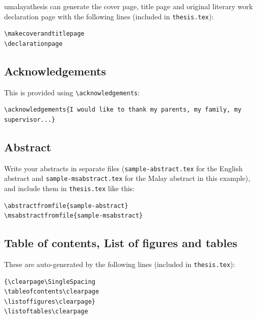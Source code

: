 \documentclass[a4paper,12pt]{scrartcl}
\begin{document}
\textsf{umalayathesis} can generate the cover page, title page and original literary work declaration page with the following lines (included in \texttt{thesis.tex}):

\medskip

\begin{lstlisting}[moretexcs={makecoverandtitlepage,copyrightpage,declarationpage}]
\makecoverandtitlepage
\declarationpage
\end{lstlisting}

\subsection{Acknowledgements}\label{sec:acknowledge}
This is provided using \lstinline|\acknowledgements|:

\medskip

\begin{lstlisting}
\acknowledgements{I would like to thank my parents, my family, my supervisor...}
\end{lstlisting}

\subsection{Abstract}\label{sec:abstract}
Write your abstracts in separate files (\texttt{sample-abstract.tex} for the English abstract and \texttt{sample-msabstract.tex} for the Malay abstract in this example), and include them in \texttt{thesis.tex} like this:

\begin{lstlisting}[moretexcs={abstractfromfile}]
\abstractfromfile{sample-abstract}
\msabstractfromfile{sample-msabstract}
\end{lstlisting}

\subsection{Table of contents, List of figures and tables}\label{sec:toc}

These are auto-generated by the following lines (included in \texttt{thesis.tex}):

\begin{lstlisting}[moretexcs={SingleSpacing,tableofcontents,listoftables,listoffigures}]
{\clearpage\SingleSpacing
\tableofcontents\clearpage
\listoffigures\clearpage}
\listoftables\clearpage
\end{lstlisting}
\end{document}
